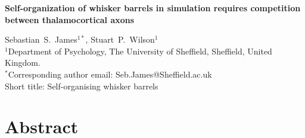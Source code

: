 \documentclass[a4paper,11pt]{article}
\date{}
\begin{document}
\begin{flushleft}
{\huge
\textbf{Self-organization of whisker barrels in simulation requires competition between thalamocortical axons}
 \vspace{5em}
}

Sebastian~S.~James$^{1*}$, Stuart~P.~Wilson$^{1}$ \vspace{1em}\\
$^{1}$Department of Psychology, The University of Sheffield, Sheffield, United Kingdom.\vspace{1em}\\
$^{*}$Corresponding author email: Seb.James@Sheffield.ac.uk\vspace{1em}\\
Short title: Self-organising whisker barrels\vspace{5em}\\
\end{flushleft}

\newpage{}

\section*{Abstract}
\end{document}

